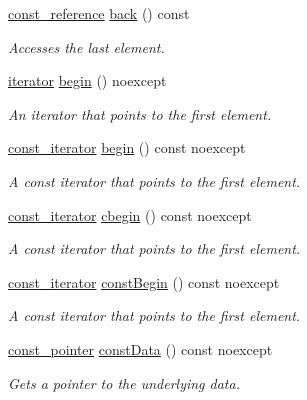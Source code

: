 \begin{DoxyCompactItemize}
\hyperlink{classprism_1_1_array_a16161ca6c0027dfa1a7c678e820eedc3}{const\+\_\+reference} \hyperlink{classprism_1_1_array_a16187f3748f5d37bd54157d27f051923}{back} () const 
\begin{DoxyCompactList}\small\item\em Accesses the last element. \end{DoxyCompactList}\item 
\hyperlink{classprism_1_1_array_a097ed322849188b1c8a8697405160638}{iterator} \hyperlink{classprism_1_1_array_a3995bfc8f8ce2637562ef1415c4000c5}{begin} () noexcept
\begin{DoxyCompactList}\small\item\em An iterator that points to the first element. \end{DoxyCompactList}\item 
\hyperlink{classprism_1_1_array_a187e11a8ec836c0b69b96b51fba73164}{const\+\_\+iterator} \hyperlink{classprism_1_1_array_a73db0443f0f1d6056675959803fa1be2}{begin} () const  noexcept
\begin{DoxyCompactList}\small\item\em A const iterator that points to the first element. \end{DoxyCompactList}\item 
\hyperlink{classprism_1_1_array_a187e11a8ec836c0b69b96b51fba73164}{const\+\_\+iterator} \hyperlink{classprism_1_1_array_aa300c54bcc563da2763f80a9eaace6ca}{cbegin} () const  noexcept
\begin{DoxyCompactList}\small\item\em A const iterator that points to the first element. \end{DoxyCompactList}\item 
\hyperlink{classprism_1_1_array_a187e11a8ec836c0b69b96b51fba73164}{const\+\_\+iterator} \hyperlink{classprism_1_1_array_ae3cf91d51cb3e2896ebb970c820bd61f}{const\+Begin} () const  noexcept
\begin{DoxyCompactList}\small\item\em A const iterator that points to the first element. \end{DoxyCompactList}\item 
\hyperlink{classprism_1_1_array_a5aa9af8079a0a39654775076cc9d16e2}{const\+\_\+pointer} \hyperlink{classprism_1_1_array_a9b49872b7a79bf1bef211d48321260ba}{const\+Data} () const  noexcept
\begin{DoxyCompactList}\small\item\em Gets a pointer to the underlying data. \end{DoxyCompactList}\item 

\end{DoxyCompactItemize}
